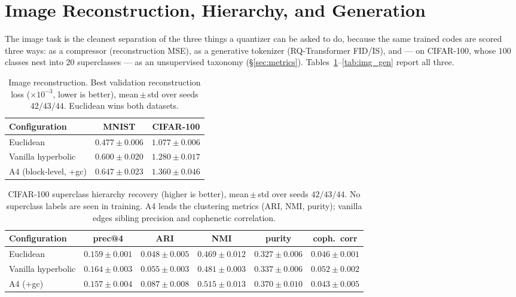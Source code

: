 \documentclass[12pt]{report}
\begin{document}
\section{Image Reconstruction, Hierarchy, and Generation}
\label{sec:exp_image}

The image task is the cleanest separation of the three things a quantizer can be asked to do, because the same trained codes are scored three ways: as a compressor (reconstruction MSE), as a generative tokenizer (RQ-Transformer FID/IS), and --- on CIFAR-100, whose $100$ classes nest into $20$ superclasses --- as an unsupervised taxonomy (\S\ref{sec:metrics}). Tables~\ref{tab:img_recon}--\ref{tab:img_gen} report all three.

\begin{table}[h]
\centering
\caption{Image reconstruction. Best validation reconstruction loss ($\times10^{-3}$, lower is better), mean\,$\pm$\,std over seeds $42/43/44$. Euclidean wins both datasets.}
\label{tab:img_recon}
\begin{tabular}{lcc}
\hline
Configuration & MNIST & CIFAR-100 \\
\hline
Euclidean & $\mathbf{0.477 \pm 0.006}$ & $\mathbf{1.077 \pm 0.006}$ \\
Vanilla hyperbolic & $0.600 \pm 0.020$ & $1.280 \pm 0.017$ \\
A4 (block-level, +gc) & $0.647 \pm 0.023$ & $1.360 \pm 0.046$ \\
\hline
\end{tabular}
\end{table}

\begin{table}[h]
\centering
\caption{CIFAR-100 superclass hierarchy recovery (higher is better), mean\,$\pm$\,std over seeds $42/43/44$. No superclass labels are seen in training. A4 leads the clustering metrics (ARI, NMI, purity); vanilla edges sibling precision and cophenetic correlation.}
\label{tab:img_hier}
\begin{tabular}{lccccc}
\hline
Configuration & prec@4 & ARI & NMI & purity & coph.\ corr \\
\hline
Euclidean & $0.159 \pm 0.001$ & $0.048 \pm 0.005$ & $0.469 \pm 0.012$ & $0.327 \pm 0.006$ & $0.046 \pm 0.001$ \\
Vanilla hyperbolic & $\mathbf{0.164 \pm 0.003}$ & $0.055 \pm 0.003$ & $0.481 \pm 0.003$ & $0.337 \pm 0.006$ & $\mathbf{0.052 \pm 0.002}$ \\
A4 (+gc) & $0.157 \pm 0.004$ & $\mathbf{0.087 \pm 0.008}$ & $\mathbf{0.515 \pm 0.013}$ & $\mathbf{0.370 \pm 0.010}$ & $0.043 \pm 0.005$ \\
\hline
\end{tabular}
\end{table}
\end{document}
